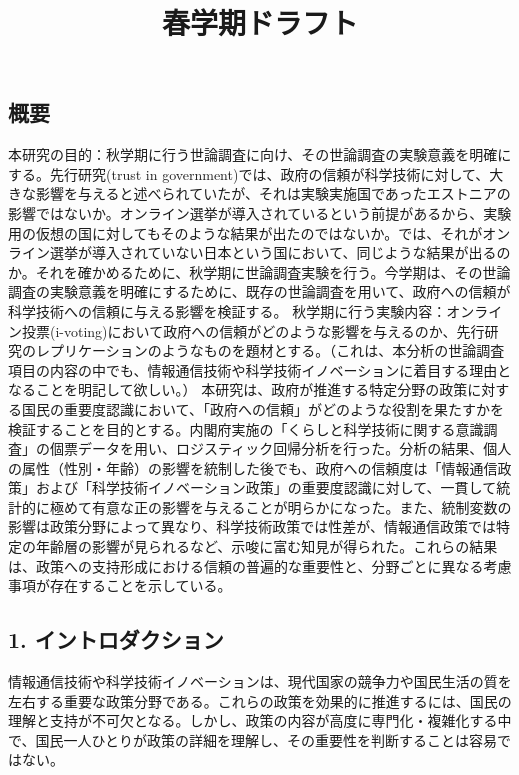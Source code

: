 \documentclass[
  xelatex]{bxjsarticle}
\title{春学期ドラフト}
\author{}
\date{}
\begin{document}
\maketitle


\subsection{概要}\label{ux6982ux8981}

本研究の目的：秋学期に行う世論調査に向け、その世論調査の実験意義を明確にする。先行研究(trust
in
government)では、政府の信頼が科学技術に対して、大きな影響を与えると述べられていたが、それは実験実施国であったエストニアの影響ではないか。オンライン選挙が導入されているという前提があるから、実験用の仮想の国に対してもそのような結果が出たのではないか。では、それがオンライン選挙が導入されていない日本という国において、同じような結果が出るのか。それを確かめるために、秋学期に世論調査実験を行う。今学期は、その世論調査の実験意義を明確にするために、既存の世論調査を用いて、政府への信頼が科学技術への信頼に与える影響を検証する。
秋学期に行う実験内容：オンライン投票(i-voting)において政府への信頼がどのような影響を与えるのか、先行研究のレプリケーションのようなものを題材とする。（これは、本分析の世論調査項目の内容の中でも、情報通信技術や科学技術イノベーションに着目する理由となることを明記して欲しい。）
本研究は、政府が推進する特定分野の政策に対する国民の重要度認識において、「政府への信頼」がどのような役割を果たすかを検証することを目的とする。内閣府実施の「くらしと科学技術に関する意識調査」の個票データを用い、ロジスティック回帰分析を行った。分析の結果、個人の属性（性別・年齢）の影響を統制した後でも、政府への信頼度は「情報通信政策」および「科学技術イノベーション政策」の重要度認識に対して、一貫して統計的に極めて有意な正の影響を与えることが明らかになった。また、統制変数の影響は政策分野によって異なり、科学技術政策では性差が、情報通信政策では特定の年齢層の影響が見られるなど、示唆に富む知見が得られた。これらの結果は、政策への支持形成における信頼の普遍的な重要性と、分野ごとに異なる考慮事項が存在することを示している。

\subsection{1.
イントロダクション}\label{ux30a4ux30f3ux30c8ux30edux30c0ux30afux30b7ux30e7ux30f3}

情報通信技術や科学技術イノベーションは、現代国家の競争力や国民生活の質を左右する重要な政策分野である。これらの政策を効果的に推進するには、国民の理解と支持が不可欠となる。しかし、政策の内容が高度に専門化・複雑化する中で、国民一人ひとりが政策の詳細を理解し、その重要性を判断することは容易ではない。
\end{document}
